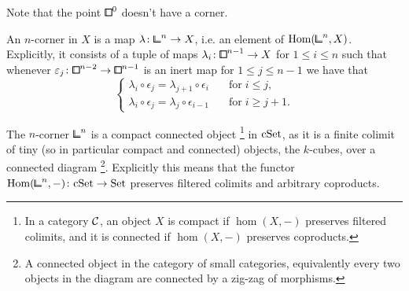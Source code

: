 \begin{center}
\end{center}

Note that the point ${\bbox}^0$ doesn't have a corner.

\begin{remark}\label{rem:corner-combinatorial}
An $n$-corner in $X$ is a map $\lambda\colon{\bbcor}^n\to X$, i.e. an element of $\hom({\bbcor}^n,X)$.
Explicitly, it consists of a tuple of maps $\lambda_i\colon{\bbox}^{n-1}\to X$ for $1\leq i\leq n$
such that whenever $\epsilon_j\colon{\bbox}^{n-2}\to{\bbox}^{n-1}$ is an inert map for $1\leq j\leq n-1$
we have that
\[
    \begin{cases}
        \lambda_i\circ\epsilon_j = \lambda_{j+1}\circ\epsilon_i\quad&\text{for}\; i\leq j, \\
        \lambda_i\circ\epsilon_j = \lambda_j\circ\epsilon_{i-1}\quad&\text{for}\; i\geq j+1.
    \end{cases}
\]
\end{remark}

\begin{remark}
The $n$-corner ${\bbcor}^n$ is a compact connected object%
\footnote{In a category $\mathcal{C}$, an object $X$ is compact if $\hom(X,-)$ preserves filtered colimits,
and it is connected if $\hom(X,-)$ preserves coproducts.}
in $\mathrm{cSet}$,
as it is a finite colimit of tiny (so in particular compact and connected) objects, the $k$-cubes,
over a connected diagram%
\footnote{A connected object in the category of small categories,
equivalently every two objects in the diagram are connected by a zig-zag of morphisms.}.
Explicitly this means that the functor $\hom({\bbcor}^n,-)\colon\cSet\to\set$ preserves filtered colimits and arbitrary coproducts.
\end{remark}


